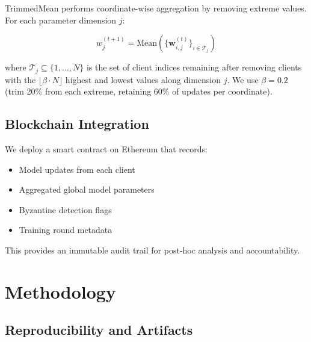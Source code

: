 \documentclass[12pt,a4paper,onecolumn]{article}
\begin{document}
TrimmedMean performs coordinate-wise aggregation by removing extreme values. For each parameter dimension $j$:

\begin{equation}
w_j^{(t+1)} = \text{Mean}\left(\{\mathbf{w}_{i,j}^{(t)}\}_{i \in \mathcal{T}_j}\right)
\label{eq:trimmed_mean}
\end{equation}

where $\mathcal{T}_j \subseteq \{1,\ldots,N\}$ is the set of client indices remaining after removing clients with the $\lfloor\beta \cdot N\rfloor$ highest and lowest values along dimension $j$. We use $\beta = 0.2$ (trim 20\% from each extreme, retaining 60\% of updates per coordinate).

\subsection{Blockchain Integration}

We deploy a smart contract on Ethereum that records:
\begin{itemize}
    \item Model updates from each client
    \item Aggregated global model parameters
    \item Byzantine detection flags
    \item Training round metadata
\end{itemize}

This provides an immutable audit trail for post-hoc analysis and accountability.

\section{Methodology}
\label{sec:methodology}

\subsection{Reproducibility and Artifacts}
\end{document}
